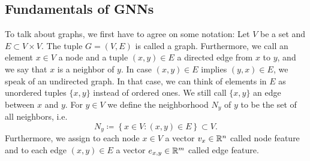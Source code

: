 \subsection{Fundamentals of GNNs}
\label{sec:fund_gnns}
To talk about graphs, we first have to agree on some notation: Let $V$ be a set and $E\subset V\times V$. The tuple $G=(V,E)$ is called a graph. Furthermore, we call an element $x\in V$ a node and a tuple 
$(x, y)\in E$ a directed edge from $x$ to $y$, and we say that $x$ is a neighbor of $y$. 
In case $(x,y)\in E$ implies $(y,x)\in E$, we speak of an undirected graph.
In that case, we can think of elements in $E$ as unordered tuples $\{x,y\}$ instead of ordered ones. We still call $\{x,y\}$ an edge between $x$ and $y$.
For $y\in V$ we define the neighborhood $N_y$ of $y$ to be the set of all neighbors, i.e.
\begin{equation}
    \label{eq:def_neighbors}
    N_y\coloneq\left\{x\in V : (x,y)\in E\right\}\subset V.
\end{equation}
Furthermore, we assign to each node $x\in V$ a vector $v_x\in\mathbb{R}^n$ called node feature and to each edge $(x, y)\in E$ a vector $e_{x,y}\in\mathbb{R}^m$ called edge feature. 


